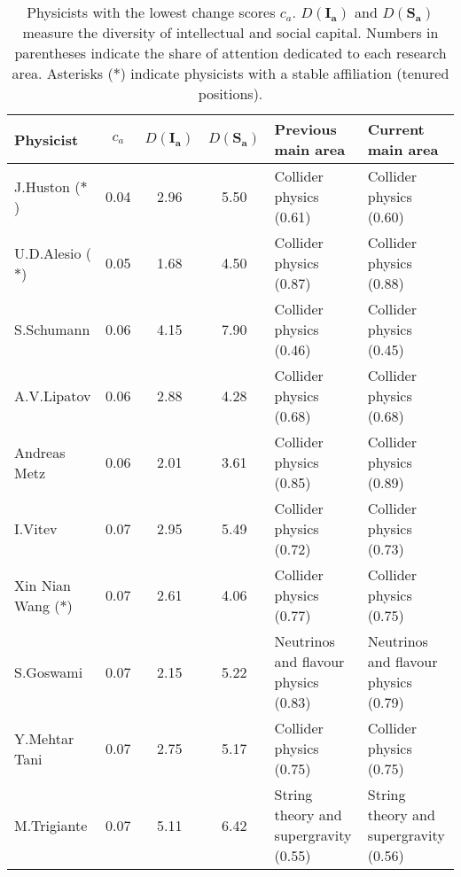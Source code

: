 \begin{table}
\centering
\caption{Physicists with the lowest change scores $c_a$. $D(\bm{I_a})$ and $D(\bm{S_a})$ measure the diversity of intellectual and social capital. Numbers in parentheses indicate the share of attention dedicated to each research area. Asterisks ($\ast$) indicate physicists with a stable affiliation (tenured positions).}
\label{table:low_change}
\begin{tabular}{p{}|c|c|c|b{}|b{}}
\toprule
              Physicist & $c_a$ & $D(\bm{I_a})$ & $D(\bm{S_a})$ &                    Previous main area &                        Current main area \\
\midrule
      J.Huston ($\ast$) &  0.04 &          2.96 &          5.50 &               Collider physics (0.61) &               Collider physics (0.60)\\ \hline
    U.D.Alesio ($\ast$) &  0.05 &          1.68 &          4.50 &               Collider physics (0.87) &               Collider physics (0.88)\\ \hline
             S.Schumann &  0.06 &          4.15 &          7.90 &               Collider physics (0.46) &               Collider physics (0.45)\\ \hline
            A.V.Lipatov &  0.06 &          2.88 &          4.28 &               Collider physics (0.68) &               Collider physics (0.68)\\ \hline
           Andreas Metz &  0.06 &          2.01 &          3.61 &               Collider physics (0.85) &               Collider physics (0.89)\\ \hline
                I.Vitev &  0.07 &          2.95 &          5.49 &               Collider physics (0.72) &               Collider physics (0.73)\\ \hline
 Xin Nian Wang ($\ast$) &  0.07 &          2.61 &          4.06 &               Collider physics (0.77) &               Collider physics (0.75)\\ \hline
              S.Goswami &  0.07 &          2.15 &          5.22 &  Neutrinos and flavour physics (0.83) &  Neutrinos and flavour physics (0.79)\\ \hline
          Y.Mehtar Tani &  0.07 &          2.75 &          5.17 &               Collider physics (0.75) &               Collider physics (0.75)\\ \hline
            M.Trigiante &  0.07 &          5.11 &          6.42 & String theory and supergravity (0.55) & String theory and supergravity (0.56)\\ \hline

\end{tabular}
\end{table}
